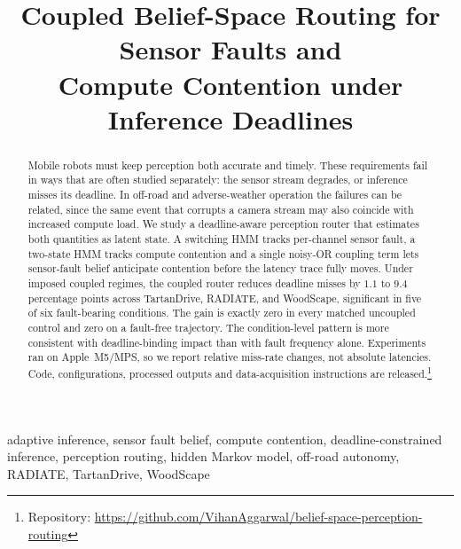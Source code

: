 \documentclass[conference]{IEEEtran}
\begin{document}
\title{Coupled Belief-Space Routing for Sensor Faults and\\
Compute Contention under Inference Deadlines}

\author{
  \and
}

\maketitle

\begin{abstract}
Mobile robots must keep perception both accurate and timely. These
requirements fail in ways that are often studied separately: the
sensor stream degrades, or inference misses its deadline. In off-road
and adverse-weather operation the failures can be related, since the
same event that corrupts a camera stream may also coincide with
increased compute load. We study a deadline-aware perception router
that estimates both quantities as latent state. A switching HMM
tracks per-channel sensor fault, a two-state HMM tracks compute
contention and a single noisy-OR coupling term lets sensor-fault
belief anticipate contention before the latency trace fully moves.
Under imposed coupled regimes, the coupled router reduces deadline
misses by $1.1$ to $9.4$ percentage points across TartanDrive,
RADIATE, and WoodScape, significant in five of six fault-bearing
conditions. The gain is exactly zero in every matched uncoupled
control and zero on a fault-free trajectory. The condition-level
pattern is more consistent with deadline-binding impact
than with fault frequency alone. Experiments ran on Apple~M5/MPS, so
we report relative miss-rate changes, not absolute latencies. Code,
configurations, processed outputs and data-acquisition instructions
are released.\footnote{Repository:
\url{https://github.com/VihanAggarwal/belief-space-perception-routing}}
\end{abstract}

\begin{IEEEkeywords}
adaptive inference, sensor fault belief, compute contention,
deadline-constrained inference, perception routing, hidden Markov
model, off-road autonomy, RADIATE, TartanDrive, WoodScape
\end{IEEEkeywords}
\end{document}
